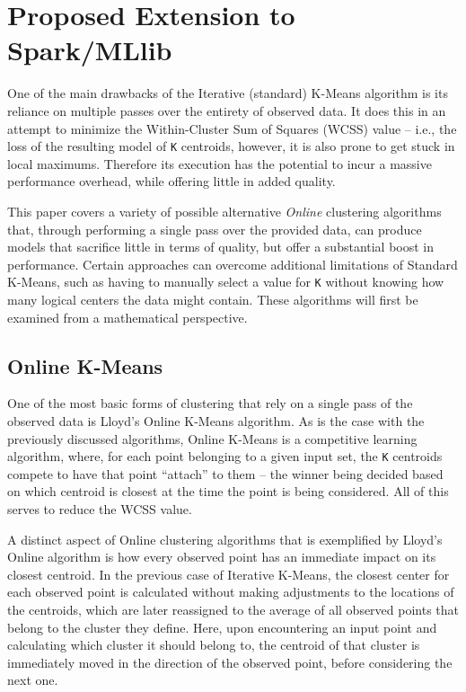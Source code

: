 \documentclass{l4proj}
\begin{document}

\chapter{Proposed Extension to Spark/MLlib}
\label{propose}

One of the main drawbacks of the Iterative (standard) K-Means algorithm is its reliance on  multiple passes over the entirety of observed data. It does this in an attempt to minimize the Within-Cluster Sum of Squares (WCSS) value -- i.e., the loss of the resulting model of \texttt{K} centroids, however, it is also prone to get stuck in local maximums. Therefore its execution has the potential to incur a massive performance overhead, while offering little in added quality.

This paper covers a variety of possible alternative \textit{Online} clustering algorithms that, through performing a single pass over the provided data, can produce models that sacrifice little in terms of quality, but offer a substantial boost in performance. Certain approaches can overcome additional limitations of Standard K-Means, such as having to manually select a value for \texttt{K} without knowing how many logical centers the data might contain. These algorithms will first be examined from a mathematical perspective.

\section{Online K-Means}

One of the most basic forms of clustering that rely on a single pass of the observed data is Lloyd's Online K-Means algorithm. As is the case with the previously discussed algorithms, Online K-Means is a competitive learning algorithm, where, for each point belonging to a given input set, the \texttt{K} centroids compete to have that point ``attach'' to them -- the winner being decided based on which centroid is closest at the time the point is being considered\cite{MLIntro}. All of this serves to reduce the WCSS value.

A distinct aspect of Online clustering algorithms that is exemplified by Lloyd's Online algorithm is how every observed point has an immediate impact on its closest centroid. In the previous case of Iterative K-Means, the closest center for each observed point is calculated without making adjustments to the locations of the centroids, which are later reassigned to the average of all observed points that belong to the cluster they define. Here, upon encountering an input point and calculating which cluster it should belong to, the centroid of that cluster is immediately moved in the direction of the observed point, before considering the next one.
\end{document}

